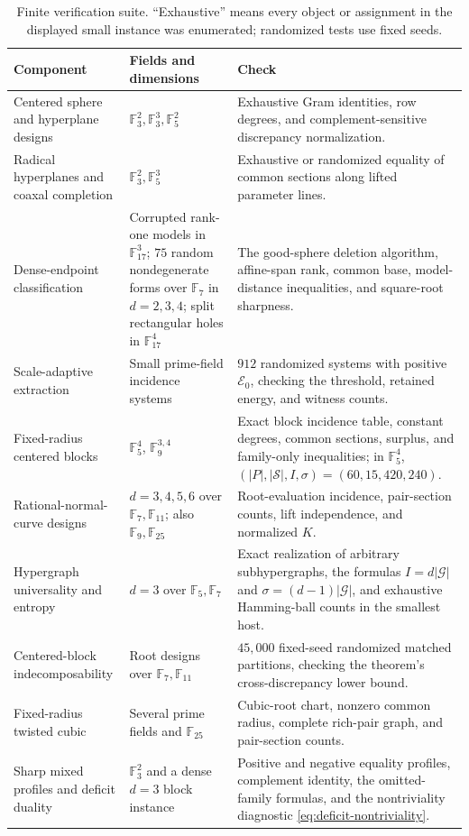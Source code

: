 \documentclass[11pt,letterpaper]{amsart}
\theoremstyle{definition}
\theoremstyle{remark}
\newcommand{\1}{\mathbf 1}
\begin{document}
\begin{table}[H]
\centering
\footnotesize
\caption{Finite verification suite.  ``Exhaustive'' means every object or assignment in the displayed small instance was enumerated; randomized tests use fixed seeds.}
\label{tab:verification}
\begin{tabularx}{\textwidth}{@{}P{0.31\textwidth}P{0.25\textwidth}Y@{}}
\toprule
Component & Fields and dimensions & Check \\
\midrule
Centered sphere and hyperplane designs & $\mathbb F_3^2,\mathbb F_3^3,\mathbb F_5^2$ & Exhaustive Gram identities, row degrees, and complement-sensitive discrepancy normalization. \\
Radical hyperplanes and coaxal completion & $\mathbb F_3^2,\mathbb F_5^3$ & Exhaustive or randomized equality of common sections along lifted parameter lines. \\
Dense-endpoint classification & Corrupted rank-one models in $\mathbb F_{17}^3$; $75$ random nondegenerate forms over $\mathbb F_7$ in $d=2,3,4$; split rectangular holes in $\mathbb F_{17}^4$ & The good-sphere deletion algorithm, affine-span rank, common base, model-distance inequalities, and square-root sharpness. \\
Scale-adaptive extraction & Small prime-field incidence systems & $912$ randomized systems with positive $\mathcal E_0$, checking the threshold, retained energy, and witness counts. \\
Fixed-radius centered blocks & $\mathbb F_5^4$, $\mathbb F_9^{3,4}$ & Exact block incidence table, constant degrees, common sections, surplus, and family-only inequalities; in $\mathbb F_5^4$, $(|P|,|\mathcal S|,I,\sigma)=(60,15,420,240)$. \\
Rational-normal-curve designs & $d=3,4,5,6$ over $\mathbb F_7,\mathbb F_{11}$; also $\mathbb F_9,\mathbb F_{25}$ & Root-evaluation incidence, pair-section counts, lift independence, and normalized $K$. \\
Hypergraph universality and entropy & $d=3$ over $\mathbb F_5,\mathbb F_7$ & Exact realization of arbitrary subhypergraphs, the formulas $I=d|\mathcal G|$ and $\sigma=(d-1)|\mathcal G|$, and exhaustive Hamming-ball counts in the smallest host. \\
Centered-block indecomposability & Root designs over $\mathbb F_7,\mathbb F_{11}$ & $45{,}000$ fixed-seed randomized matched partitions, checking the theorem's cross-discrepancy lower bound. \\
Fixed-radius twisted cubic & Several prime fields and $\mathbb F_{25}$ & Cubic-root chart, nonzero common radius, complete rich-pair graph, and pair-section counts. \\
Sharp mixed profiles and deficit duality & $\mathbb F_3^2$ and a dense $d=3$ block instance & Positive and negative equality profiles, complement identity, the omitted-family formulas, and the nontriviality diagnostic \eqref{eq:deficit-nontriviality}. \\
\bottomrule
\end{tabularx}
\end{table}
\end{document}
